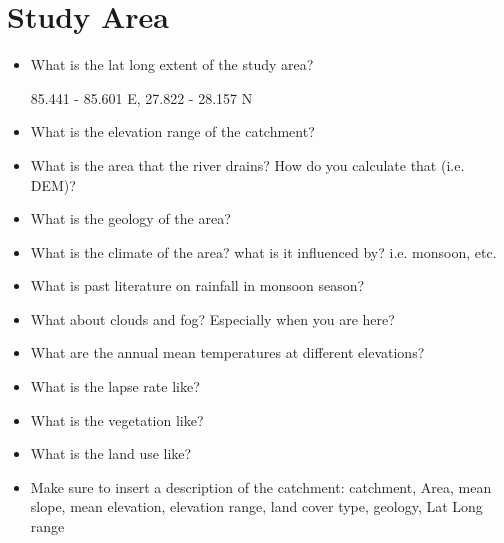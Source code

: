 
\section{Study Area}


\begin{itemize}

\item{What is the lat long extent of the study area?}

85.441 - 85.601 E, 27.822 - 28.157 N

\item{What is the elevation range of the catchment?}

\item{What is the area that the river drains? How do you calculate that (i.e. DEM)?}

\item{What is the geology of the area?}

\item{What is the climate of the area? what is it influenced by? i.e. monsoon, etc.}

\item{What is past literature on rainfall in monsoon season?}

\item{What about clouds and fog? Especially when you are here?}

\item{What are the annual mean temperatures at different elevations?}

\item{What is the lapse rate like?}

\item{What is the vegetation like?}

\item{What is the land use like?}

\item{Make sure to insert a description of the catchment: catchment, Area, mean slope, mean elevation, elevation range, land cover type, geology, Lat Long range}


\end{itemize}
